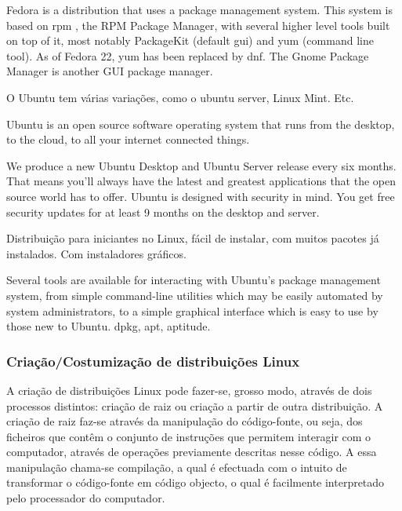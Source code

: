 \documentclass[
	article,			%
	12pt,				%
	openright,			%
	oneside,			%
	a4paper,			%
	chapter=TITLE,		%
	section=TITLE,		%
	subsection=TITLE,	%
	subsubsection=TITLE,%
	subsubsubsection=TITLE, %
	english,			%
	brazil,				%
	]{abntex2}
\begin{document}
\cite{FedoraProject2018a}

Fedora is a distribution that uses a package management system. This system is based on rpm , the RPM Package Manager, with several higher level tools built on top of it, most notably PackageKit (default gui) and yum (command line tool). As of Fedora 22, yum has been replaced by dnf. The Gnome Package Manager is another GUI package manager. 

\cite{FedoraProject2018b}


O Ubuntu tem várias variações, como o ubuntu server, Linux Mint. Etc.

Ubuntu is an open source software operating system that runs from the desktop, to the cloud, to all your internet connected things.

\cite{UbuntuFundation2018}

We produce a new Ubuntu Desktop and Ubuntu Server release every six months. That means you'll always have the latest and greatest applications that the open source world has to offer. Ubuntu is designed with security in mind. You get free security updates for at least 9 months on the desktop and server.

\cite{UbuntuWiki2017}

Distribuição para iniciantes no Linux, fácil de instalar, com muitos pacotes já instalados. Com instaladores gráficos.

Several tools are available for interacting with Ubuntu's package management system, from simple command-line utilities which may be easily automated by system administrators, to a simple graphical interface which is easy to use by those new to Ubuntu. dpkg, apt, aptitude.

\cite{UbuntuWiki2018}

\subsubsection{Criação/Costumização de distribuições Linux}

A criação de distribuições Linux pode fazer-se, grosso modo, através de dois processos distintos: criação de raiz ou criação a partir de outra distribuição. A criação de raiz faz-se através da manipulação do código-fonte, ou seja, dos ficheiros que contêm o conjunto de instruções que permitem interagir com o computador, através de operações previamente descritas nesse código. A essa manipulação chama-se compilação, a qual é efectuada com o intuito de transformar o código-fonte em código objecto, o qual é facilmente interpretado pelo processador do computador.
\end{document}

